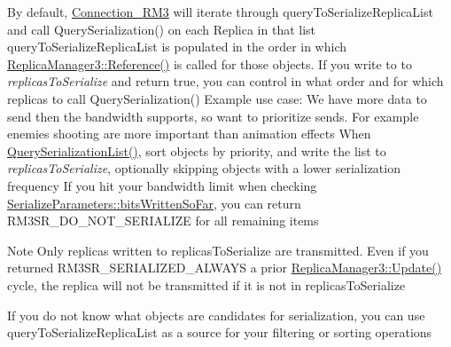 By default, \hyperlink{class_rak_net_1_1_connection___r_m3}{Connection\-\_\-\-R\-M3} will iterate through query\-To\-Serialize\-Replica\-List and call Query\-Serialization() on each Replica in that list query\-To\-Serialize\-Replica\-List is populated in the order in which \hyperlink{class_rak_net_1_1_replica_manager3_a9046d827471c0be651b54b7efb7b6f28}{Replica\-Manager3\-::\-Reference()} is called for those objects. If you write to to {\itshape replicas\-To\-Serialize} and return true, you can control in what order and for which replicas to call Query\-Serialization() Example use case\-: We have more data to send then the bandwidth supports, so want to prioritize sends. For example enemies shooting are more important than animation effects When \hyperlink{class_rak_net_1_1_connection___r_m3_a9dc79ed7a9252f7ae358b62ec1fbb195}{Query\-Serialization\-List()}, sort objects by priority, and write the list to {\itshape replicas\-To\-Serialize}, optionally skipping objects with a lower serialization frequency If you hit your bandwidth limit when checking \hyperlink{struct_rak_net_1_1_serialize_parameters_ac69a7436aa2040a35ba5c43079609321}{Serialize\-Parameters\-::bits\-Written\-So\-Far}, you can return R\-M3\-S\-R\-\_\-\-D\-O\-\_\-\-N\-O\-T\-\_\-\-S\-E\-R\-I\-A\-L\-I\-Z\-E for all remaining items \begin{DoxyNote}{Note}
Only replicas written to replicas\-To\-Serialize are transmitted. Even if you returned R\-M3\-S\-R\-\_\-\-S\-E\-R\-I\-A\-L\-I\-Z\-E\-D\-\_\-\-A\-L\-W\-A\-Y\-S a prior \hyperlink{class_rak_net_1_1_replica_manager3_a8aa2fdb5b20aeeab74b037bc1632c9e9}{Replica\-Manager3\-::\-Update()} cycle, the replica will not be transmitted if it is not in replicas\-To\-Serialize 

If you do not know what objects are candidates for serialization, you can use query\-To\-Serialize\-Replica\-List as a source for your filtering or sorting operations 
\end{DoxyNote}

